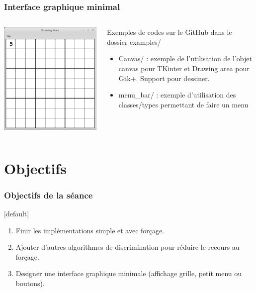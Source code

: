 \documentclass{beamer}
\begin{document}
	\begin{frame}
		\frametitle{Interface graphique minimal}
		\begin{columns}[c]
			\begin{column}{5cm}
				\includegraphics[width=\textwidth,height=\textheight,keepaspectratio]{GUI.png}
			\end{column}
			\begin{column}{7cm}
				Exemples de codes sur le GitHub dans le dossier examples/ \\
				\begin{itemize}
					\item Canvas/ : exemple de l'utilisation de l'objet canvas pour TKinter et Drawing area pour Gtk+. Support pour dessiner.
					\item menu\_bar/ : exemple d'utilisation des classes/types permettant de faire un menu
				\end{itemize}
			\end{column}
		\end{columns}
	\end{frame}

	\section{Objectifs}
	\begin{frame}
	\frametitle{Objectifs de la séance}
	[default]
	\begin{enumerate}
		\item Finir les implémentations simple et avec forçage.
		\item Ajouter d'autres algorithmes de discrimination pour réduire le recours au forçage.
		\item Designer une interface graphique minimale (affichage grille, petit menu ou boutons).
	\end{enumerate}
	\end{frame}
\end{document}

